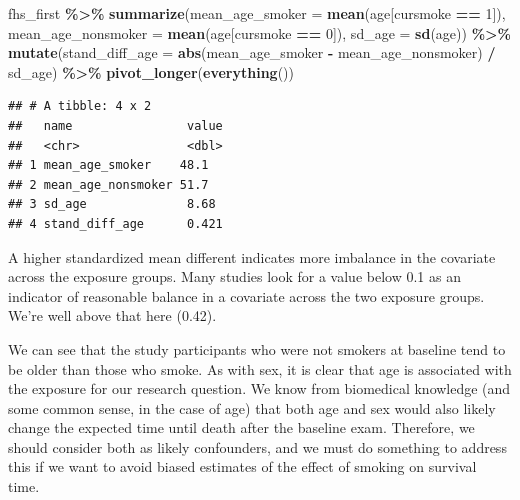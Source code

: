 \documentclass[
]{book}
\newenvironment{Shaded}{\begin{snugshade}}{\end{snugshade}}
\newcommand{\AttributeTok}[1]{\textcolor[rgb]{0.13,0.29,0.53}{#1}}
\newcommand{\DecValTok}[1]{\textcolor[rgb]{0.00,0.00,0.81}{#1}}
\newcommand{\FunctionTok}[1]{\textcolor[rgb]{0.13,0.29,0.53}{\textbf{#1}}}
\newcommand{\NormalTok}[1]{#1}
\newcommand{\SpecialCharTok}[1]{\textcolor[rgb]{0.81,0.36,0.00}{\textbf{#1}}}
\begin{document}
\begin{Shaded}
\begin{Highlighting}[]
\NormalTok{fhs\_first }\SpecialCharTok{\%\textgreater{}\%} 
  \FunctionTok{summarize}\NormalTok{(}\AttributeTok{mean\_age\_smoker =} \FunctionTok{mean}\NormalTok{(age[cursmoke }\SpecialCharTok{==} \DecValTok{1}\NormalTok{]), }
            \AttributeTok{mean\_age\_nonsmoker =} \FunctionTok{mean}\NormalTok{(age[cursmoke }\SpecialCharTok{==} \DecValTok{0}\NormalTok{]), }
            \AttributeTok{sd\_age =} \FunctionTok{sd}\NormalTok{(age)) }\SpecialCharTok{\%\textgreater{}\%} 
  \FunctionTok{mutate}\NormalTok{(}\AttributeTok{stand\_diff\_age =} \FunctionTok{abs}\NormalTok{(mean\_age\_smoker }\SpecialCharTok{{-}}\NormalTok{ mean\_age\_nonsmoker) }\SpecialCharTok{/}\NormalTok{ sd\_age) }\SpecialCharTok{\%\textgreater{}\%} 
  \FunctionTok{pivot\_longer}\NormalTok{(}\FunctionTok{everything}\NormalTok{())}
\end{Highlighting}
\end{Shaded}

\begin{verbatim}
## # A tibble: 4 x 2
##   name                value
##   <chr>               <dbl>
## 1 mean_age_smoker    48.1  
## 2 mean_age_nonsmoker 51.7  
## 3 sd_age              8.68 
## 4 stand_diff_age      0.421
\end{verbatim}

A higher standardized mean different indicates more imbalance in the covariate across the exposure groups. Many studies look for a value below 0.1 as an indicator of reasonable balance in a covariate across the two exposure groups. We're well above that here (0.42).

We can see that the study participants who were not smokers at baseline tend to be older than those who smoke. As with sex, it is clear that age is associated with the exposure for our research question. We know from biomedical knowledge (and some common sense, in the case of age) that both age and sex would also likely change the expected time until death after the baseline exam. Therefore, we should consider both as likely confounders, and we must do something to address this if we want to avoid biased estimates of the effect of smoking on survival time.
\end{document}
